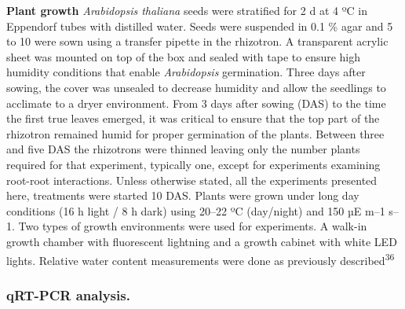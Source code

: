 \documentclass[]{article}
\begin{document}
\textbf{Plant growth} \emph{Arabidopsis thaliana} seeds were stratified
for 2 d at 4 ºC in Eppendorf tubes with distilled water. Seeds were
suspended in 0.1 \% agar and 5 to 10 were sown using a transfer pipette
in the rhizotron. A transparent acrylic sheet was mounted on top of the
box and sealed with tape to ensure high humidity conditions that enable
\emph{Arabidopsis} germination. Three days after sowing, the cover was
unsealed to decrease humidity and allow the seedlings to acclimate to a
dryer environment. From 3 days after sowing (DAS) to the time the first
true leaves emerged, it was critical to ensure that the top part of the
rhizotron remained humid for proper germination of the plants. Between
three and five DAS the rhizotrons were thinned leaving only the number
plants required for that experiment, typically one, except for
experiments examining root-root interactions. Unless otherwise stated,
all the experiments presented here, treatments were started 10 DAS.
Plants were grown under long day conditions (16 h light / 8 h dark)
using 20--22 ºC (day/night) and 150 µE m--1 s--1. Two types of growth
environments were used for experiments. A walk-in growth chamber with
fluorescent lightning and a growth cabinet with white LED lights.
Relative water content measurements were done as previously
described\textsuperscript{36}

\subsubsection{qRT-PCR analysis.}\label{qrt-pcr-analysis.}
\end{document}
